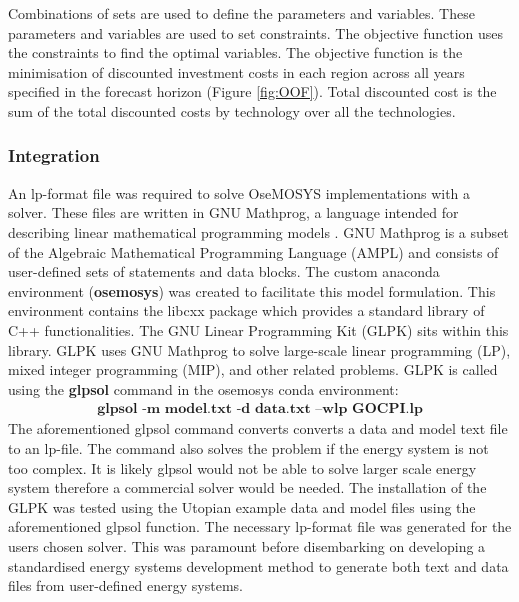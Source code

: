 \documentclass[12pt]{article}
\begin{document}
Combinations of sets are used to define the parameters and variables.
These parameters and variables are used to set constraints. 
The objective function uses the constraints to find the optimal variables.
The objective function is the minimisation of discounted investment costs in each region across all years specified in the forecast horizon (Figure \ref{fig:OOF}).
Total discounted cost is the sum of the total discounted costs by technology over all the technologies.

\subsubsection{Integration}
An lp-format file was required to solve OseMOSYS implementations with a solver.
These files are written in GNU Mathprog, a language intended for describing linear mathematical programming models \cite{GNU_Mathprog}. 
GNU Mathprog is a subset of the Algebraic Mathematical Programming Language (AMPL) \cite{AMPL} and consists of user-defined sets of statements and data blocks.
The custom anaconda environment (\textbf{osemosys}) was created to facilitate this model formulation. This environment contains the libcxx package which provides a standard library of C++ functionalities.
The GNU Linear Programming Kit (GLPK) sits within this library. GLPK uses GNU Mathprog to solve large-scale linear programming (LP), mixed integer programming (MIP), and other related problems. 
GLPK is called using the \textbf{glpsol} command in the osemosys conda environment:
\begin{align*}	
	\textbf{glpsol -m model.txt -d data.txt --wlp GOCPI.lp}
\end{align*}
The aforementioned glpsol command converts converts a data and model text file to an lp-file. 
The command also solves the problem if the energy system is not too complex.
It is likely glpsol would not be able to solve larger scale energy system therefore a commercial solver would be needed.
The installation of the GLPK was tested using the Utopian example data and model files using the aforementioned glpsol function.
The necessary lp-format file was generated for the users chosen solver. 
This was paramount before disembarking on developing a standardised energy systems development method to generate both text and data files from user-defined energy systems.
\end{document}
